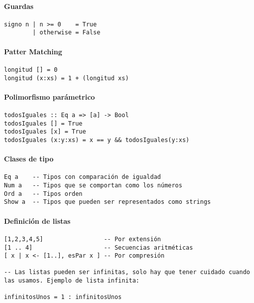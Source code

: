 \documentclass[10pt,a4paper]{article}
\begin{document}
\paragraph{Guardas}
\begin{centrado}
	\begin{verbatim}
signo n | n >= 0    = True
        | otherwise = False
	\end{verbatim}
\end{centrado}

\paragraph{Patter Matching}
\begin{centrado}
	\begin{verbatim}
longitud [] = 0
longitud (x:xs) = 1 + (longitud xs)
	\end{verbatim}
\end{centrado}

\paragraph{Polimorfismo parámetrico}
\begin{centrado}
	\begin{verbatim}
todosIguales :: Eq a => [a] -> Bool
todosIguales [] = True
todosIguales [x] = True
todosIguales (x:y:xs) = x == y && todosIguales(y:xs)
	\end{verbatim}
\end{centrado}

\paragraph{Clases de tipo}
\begin{centrado}
	\begin{verbatim}
Eq a    -- Tipos con comparación de igualdad
Num a   -- Tipos que se comportan como los números
Ord a   -- Tipos orden
Show a  -- Tipos que pueden ser representados como strings
	\end{verbatim}
\end{centrado}

\paragraph{Definición de listas}
\begin{centrado}
	\begin{verbatim}
[1,2,3,4,5]                 -- Por extensión
[1 .. 4]                    -- Secuencias aritméticas
[ x | x <- [1..], esPar x ] -- Por compresión

-- Las listas pueden ser infinitas, solo hay que tener cuidado cuando las usamos. Ejemplo de lista infinita:
	
infinitosUnos = 1 : infinitosUnos
	\end{verbatim}
\end{centrado}
\end{document}
